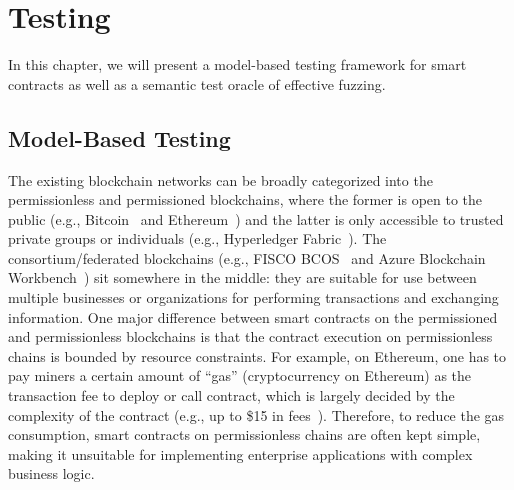 
\chapter{Testing} %
\label{ch:modcon} %

In this chapter, we will present a model-based testing framework for smart contracts as well as a semantic test oracle of effective fuzzing.
\section{Model-Based Testing}
\label{sec:intro}

The existing blockchain networks can be broadly categorized into the permissionless and
permissioned blockchains, where the former is open to the public (e.g.,
Bitcoin~\cite{nakamoto2008bitcoin} and Ethereum~\cite{Ethereum}) and the latter is only accessible
to trusted private groups or individuals (e.g., Hyperledger Fabric~\cite{hyperledger-fabric}).
The consortium/federated blockchains (e.g., FISCO BCOS~\cite{fisco} and Azure Blockchain
Workbench~\cite{azure-workbench}) sit somewhere in the middle: they are suitable for use between
multiple businesses or organizations for performing  transactions and exchanging information.
One major difference between smart contracts on the permissioned and permissionless blockchains is that the
contract execution on permissionless chains is bounded by resource constraints.
For example, on Ethereum, one has to pay miners a certain amount of ``gas'' (cryptocurrency on Ethereum) as the transaction fee to deploy or call contract, which is largely decided by the complexity of the contract (e.g., up to \$15 in fees~\cite{gas-fee}).
Therefore, to reduce the gas consumption, smart contracts on permissionless chains are often kept simple, making it
unsuitable for implementing enterprise applications with complex business logic.

